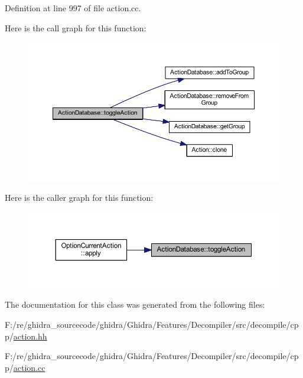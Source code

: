 Definition at line 997 of file action.\+cc.

Here is the call graph for this function\+:
\nopagebreak
\begin{figure}[H]
\begin{center}
\leavevmode
\includegraphics[width=350pt]{class_action_database_a3b83440563e2eb689ab44c715679f41f_cgraph}
\end{center}
\end{figure}
Here is the caller graph for this function\+:
\nopagebreak
\begin{figure}[H]
\begin{center}
\leavevmode
\includegraphics[width=350pt]{class_action_database_a3b83440563e2eb689ab44c715679f41f_icgraph}
\end{center}
\end{figure}


The documentation for this class was generated from the following files\+:\begin{DoxyCompactItemize}
\item 
F\+:/re/ghidra\+\_\+sourcecode/ghidra/\+Ghidra/\+Features/\+Decompiler/src/decompile/cpp/\mbox{\hyperlink{action_8hh}{action.\+hh}}\item 
F\+:/re/ghidra\+\_\+sourcecode/ghidra/\+Ghidra/\+Features/\+Decompiler/src/decompile/cpp/\mbox{\hyperlink{action_8cc}{action.\+cc}}\end{DoxyCompactItemize}
